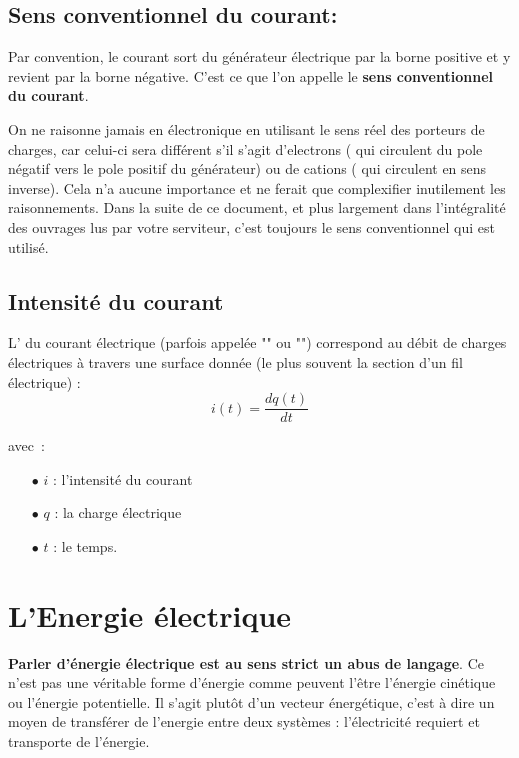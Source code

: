 \subsection*{ Sens conventionnel du courant: }

Par convention, le courant sort du générateur électrique par la borne positive et y revient par la borne négative. C'est ce que l'on appelle le \textbf{sens conventionnel du courant}. \\

On ne raisonne jamais en électronique en utilisant le sens réel des porteurs de charges, car celui-ci sera différent s'il s'agit d'electrons ( qui circulent du pole négatif vers le pole positif du générateur) ou de cations ( qui circulent en sens inverse). Cela n'a aucune importance et ne ferait que complexifier inutilement les raisonnements. Dans la suite de ce document, et plus largement dans l'intégralité des ouvrages lus par votre serviteur, c'est toujours le sens conventionnel qui est utilisé.

\subsection*{Intensité du courant}

L' du courant électrique (parfois appelée "" ou "") correspond au débit de charges électriques à travers une surface donnée (le plus souvent la section d'un fil électrique) : \\

\begin{equation}
	i(t) = \dfrac{dq(t)}{dt} 
\end{equation}

avec~: \\
\begin{itemize}
	\item[$\bullet$] $i$ : l'intensité du courant
	\item[$\bullet$] $q$ : la charge électrique
	\item[$\bullet$] $t$ : le temps.
\end{itemize}

\section{L'Energie électrique}

\textbf{Parler d'énergie électrique est au sens strict un abus de langage}. Ce n'est pas une véritable forme d'énergie comme peuvent l'être l'énergie cinétique ou l'énergie potentielle. Il s'agit plutôt d'un vecteur énergétique, c'est à dire un moyen de transférer de l'energie entre deux systèmes : l'électricité requiert et transporte de l'énergie. \\

